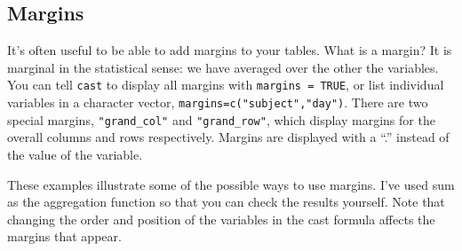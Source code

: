 \documentclass[oneside,letterpaper]{scrartcl}
\begin{document}
\subsection{Margins}\label{sub:margins}

It's often useful to be able to add margins to your tables.  What is a margin?  It is marginal in the statistical sense: we have averaged over the other the variables.  You can tell {\tt cast} to display all margins with {\tt margins = TRUE}, or list individual variables in a character vector, {\tt margins=c("subject","day")}.  There are two special margins, {\tt "grand\_col"} and {\tt "grand\_row"}, which display margins for the overall columns and rows respectively. Margins are displayed with a ``.'' instead of the value of the variable. 

These examples illustrate some of the possible ways to use margins.  I've used sum as the aggregation function so that you can check the results yourself. Note that changing the order and position of the variables in the cast formula affects the margins that appear.  
\end{document}
